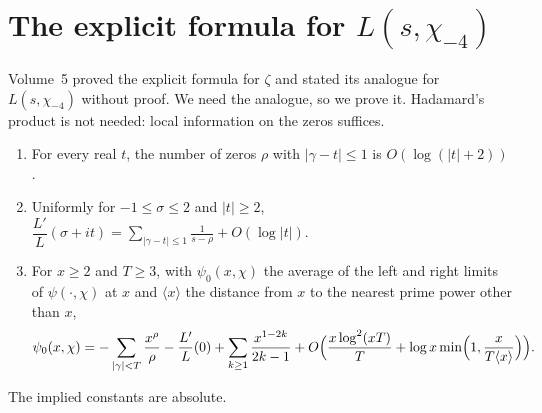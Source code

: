 \section{The explicit formula for \texorpdfstring{$L(s,\chi_{-4})$}{L(s,chi-4)}}

Volume~5 proved the explicit formula for $\zeta$ and stated its analogue for $L(s,\chi_{-4})$ without proof. We need the analogue, so we prove it. Hadamard's product is not needed: local information on the zeros suffices.

\begin{theorem}\label{thm:explicitchi}
\leavevmode
\begin{enumerate}[label=(\alph*)]
\item For every real $t$, the number of zeros $\rho$ with $|\gamma-t|\le1$ is $O(\log(|t|+2))$.
\item Uniformly for $-1\le\sigma\le2$ and $|t|\ge2$, $\dfrac{L'}L(\sigma+it)=\displaystyle\sum_{|\gamma-t|\le1}\frac1{s-\rho}+O(\log|t|)$.
\item For $x\ge2$ and $T\ge3$, with $\psi_0(x,\chi)$ the average of the left and right limits of $\psi(\cdot,\chi)$ at $x$ and $\langle x\rangle$ the distance from $x$ to the nearest prime power other than $x$,
\[
\psi_0(x,\chi)=-\sum_{|\gamma|<T}\frac{x^\rho}\rho-\frac{L'}L(0)+\sum_{k\ge1}\frac{x^{1-2k}}{2k-1}+O\Bigl(\frac{x\log^2(xT)}T+\log x\min\Bigl(1,\frac x{T\langle x\rangle}\Bigr)\Bigr).
\]
\end{enumerate}
The implied constants are absolute.
\end{theorem}
